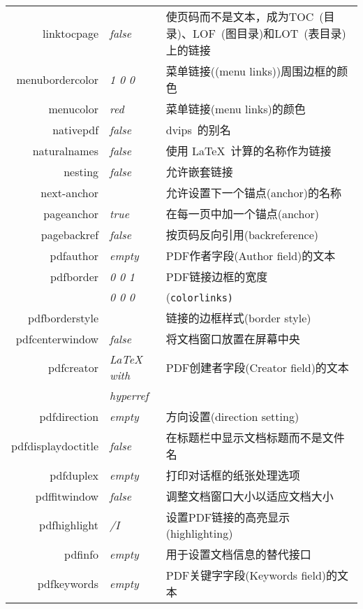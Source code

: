 \documentclass{article}
\begin{document}
\begin{longtable}{@{}>{\ttfamily}rlp{7cm}@{}}
linktocpage        & \textit{false}         & 使页码而不是文本，成为TOC~(目录)、LOF~(图目录)和LOT~(表目录)上的链接\\
menubordercolor    & \textit{1 0 0}         & 菜单链接((menu links))周围边框的颜色 \\
menucolor          & \textit{red}           & 菜单链接(menu links)的颜色\\
nativepdf          & \textit{false}         & \textsf{dvips}\ 的别名 \\
naturalnames       & \textit{false}         & 使用 \LaTeX\ 计算的名称作为链接\\
nesting            & \textit{false}         & 允许嵌套链接 \\
next-anchor        &                        & 允许设置下一个锚点(anchor)的名称\\
pageanchor         & \textit{true}          & 在每一页中加一个锚点(anchor)\\
pagebackref        & \textit{false}         & 按页码反向引用(backreference)\\
pdfauthor          & \textit{empty}         & PDF作者字段(Author field)的文本\\
pdfborder          & \textit{0 0 1}         & PDF链接边框的宽度 \\
                   & \textit{0 0 0}         & (\texttt{colorlinks)} \\
pdfborderstyle     &                        & 链接的边框样式(border style)\\
pdfcenterwindow    & \textit{false}         & 将文档窗口放置在屏幕中央 \\
pdfcreator         & \textit{LaTeX with}    & PDF创建者字段(Creator field)的文本\\
                   & \textit{hyperref}      & \\
pdfdirection       & \textit{empty}         & 方向设置(direction setting) \\
pdfdisplaydoctitle & \textit{false}         & 在标题栏中显示文档标题而不是文件名\\
pdfduplex          & \textit{empty}         & 打印对话框的纸张处理选项\\
pdffitwindow       & \textit{false}         & 调整文档窗口大小以适应文档大小 \\
pdfhighlight       & \textit{/I}            & 设置PDF链接的高亮显示(highlighting)\\
pdfinfo            & \textit{empty}         & 用于设置文档信息的替代接口\\
pdfkeywords        & \textit{empty}         & PDF关键字字段(Keywords field)的文本\\

\end{longtable}
\end{document}
